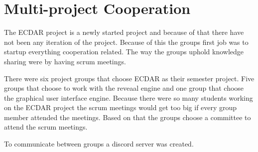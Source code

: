 \section{Multi-project Cooperation}\label{Scrum/multi-project-cooperation}
The ECDAR project is a newly started project and because of that there have not been any iteration of the project.
Because of this the groups first job was to startup everything cooperation related. 
The way the groups uphold knowledge sharing were by having scrum meetings.

There were six project groups that choose ECDAR as their semester project. 
Five groups that choose to work with the reveaal engine and one group that choose the graphical user interface engine.
Because there were so many students working on the ECDAR project the scrum meetings would get too big if every group member attended the meetings.
Based on that the groups choose a committee to attend the scrum meetings.

To communicate between groups a discord server was created.

